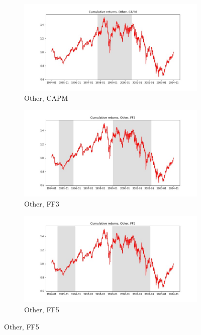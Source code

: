 \documentclass{article}
\begin{document}
 \begin{figure}
  \centering
  \begin{subfigure}[b]{0.3\textwidth}
    \centering
    \includegraphics[width=\textwidth]{Other/full_cumrets_ofint_CAPM.jpg}
    \caption{Other, CAPM}
    \label{fig:1}
  \end{subfigure}
  \begin{subfigure}[b]{0.3\textwidth}
    \centering
    \includegraphics[width=\textwidth]{Other/full_cumrets_ofint_FF3.jpg}
    \caption{Other, FF3}
    \label{fig:2}
  \end{subfigure}
    \begin{subfigure}[b]{0.3\textwidth}
    \centering
    \includegraphics[width=\textwidth]{Other/full_cumrets_ofint_FF5.jpg}
    \caption{Other, FF5}
    \label{fig:1}
  \end{subfigure}
  \end{figure}
        
  
\end{document}
